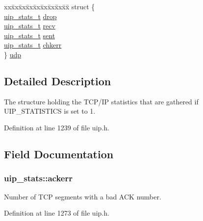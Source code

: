 \begin{DoxyCompactItemize}
\begin{tabbing}
\end{tabbing}\item 
\begin{tabbing}
xx\=xx\=xx\=xx\=xx\=xx\=xx\=xx\=xx\=\kill
struct \{\\
\>\hyperlink{group__uipfw_ga727459e5c4f777543c81ffffa3df3f0c}{uip\_stats\_t} \hyperlink{structuip__stats_a5d8996950cdf3d8130cc3ad340eb9dff}{drop}\\
\>\hyperlink{group__uipfw_ga727459e5c4f777543c81ffffa3df3f0c}{uip\_stats\_t} \hyperlink{structuip__stats_a7f7bb2145afba5df00c6e10ddefa8ae1}{recv}\\
\>\hyperlink{group__uipfw_ga727459e5c4f777543c81ffffa3df3f0c}{uip\_stats\_t} \hyperlink{structuip__stats_adc69abadd5aa07c7d74f9292db2cd93c}{sent}\\
\>\hyperlink{group__uipfw_ga727459e5c4f777543c81ffffa3df3f0c}{uip\_stats\_t} \hyperlink{structuip__stats_a7675e6b9adbddbd545d3aac8ca092fbb}{chkerr}\\
\} \hyperlink{structuip__stats_a5e368c2c7dcfeaa1ad1309b480e98d4d}{udp}\\

\end{tabbing}\end{DoxyCompactItemize}


\subsection{Detailed Description}
The structure holding the TCP/IP statistics that are gathered if UIP\_\-STATISTICS is set to 1. 

Definition at line 1239 of file uip.h.



\subsection{Field Documentation}
\hypertarget{structuip__stats_a7a58d95f7f7827789ff52500e3d16c34}{
\subsubsection[{ackerr}]{ {\bf uip\_\-stats::ackerr}}}
\label{structuip__stats_a7a58d95f7f7827789ff52500e3d16c34}
Number of TCP segments with a bad ACK number. 

Definition at line 1273 of file uip.h.

